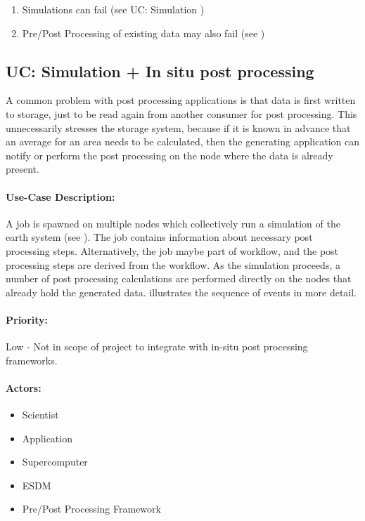 \begin{enumerate}
	\item Simulations can fail (see UC: Simulation )
	\item Pre/Post Processing of existing data may also fail (see )
\end{enumerate}


\subsection{UC: Simulation + In situ post processing}
\label{uc: simulation + in-situ + post processing}

A common problem with post processing applications is that data is first written to storage, just to be read again from another consumer for post processing.
This unnecessarily stresses the storage system, because if it is known in advance that an average for an area needs to be calculated, then the generating application can notify or perform the post processing on the node where the data is already present.


\paragraph{Use-Case Description:}
A job is spawned on multiple nodes which collectively run a simulation of the earth system (see ).
The job contains information about necessary post processing steps.
Alternatively, the job maybe part of workflow, and the post processing steps are derived from the workflow.
As the simulation proceeds, a number of post processing calculations are performed directly on the nodes that already hold the generated data.
 illustrates the sequence of events in more detail.

\paragraph{Priority:} Low - Not in scope of project to integrate with in-situ post processing frameworks.


\paragraph{Actors:}
\begin{itemize}
	\item Scientist
	\item Application
	\item Supercomputer
	\item ESDM
	\item Pre/Post Processing Framework
\end{itemize}


